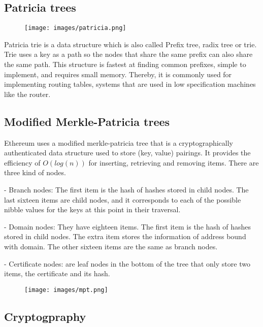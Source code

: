 \documentclass{article}
\begin{document}
\pagebreak

\subsection{Patricia trees}

\begin{figure}[hbt!]
 \centering
\texttt{[image: images/patricia.png]}
\end{figure}


Patricia trie is a data structure which is also called Prefix tree, radix tree or trie. Trie uses a key as a path so the nodes that share the same prefix can also share the same path. This structure is fastest at finding common prefixes, simple to implement, and requires small memory. Thereby, it is commonly used for implementing routing tables, systems that are used in low specification machines like the router.



\subsection{Modified Merkle-Patricia trees}

Ethereum uses a modified merkle-patricia tree that is a cryptographically authenticated data structure used to store (key, value) pairings. It provides the efficiency of $ O(log(n))$ for inserting, retrieving and removing items. There are three kind of nodes. \newline

- Branch nodes: The first item is the hash of hashes stored in child nodes. The last sixteen items are child nodes, and it corresponds to each of the possible nibble values for the keys at this point in their traversal.

- Domain nodes: They have eighteen items. The first item is the hash of hashes stored in child nodes. The extra item stores the information of address bound with domain. The other sixteen items are the same as branch nodes.

- Certificate nodes: are leaf nodes in the bottom of the tree that only store two items, the certificate and its hash.

\begin{figure}[hbt!]
 \centering
\texttt{[image: images/mpt.png]}
\end{figure}

\pagebreak


\subsection{Cryptogpraphy}
\end{document}
